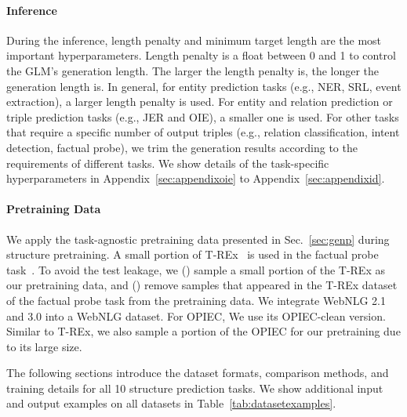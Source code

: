 \paragraph{Inference} During the inference, length penalty and minimum target length are the most important hyperparameters. Length penalty is a float between 0 and 1 to control the GLM's generation length. The larger the length penalty is, the longer the generation length is. In general, for entity prediction tasks (e.g., NER, SRL, event extraction), a larger length penalty is used. For entity and relation prediction or triple prediction tasks (e.g., JER and OIE), a smaller one is used. For other tasks that require a specific number of output triples (e.g., relation classification, intent detection, factual probe), we trim the generation results according to the requirements of different tasks. We show details of the task-specific hyperparameters in Appendix~\ref{sec:appendixoie} to Appendix~\ref{sec:appendixid}.

\paragraph{Pretraining Data}
We apply the task-agnostic pretraining data presented in Sec.~\ref{sec:genp} during structure pretraining. A small portion of T-REx~\cite{elsahar2018t} is used in the factual probe task~\cite{petroni2020context}. To avoid the test leakage, we (\expandafter{}) sample a small portion of the T-REx as our pretraining data, and (\expandafter{}) remove samples that appeared in the T-REx dataset of the factual probe task from the pretraining data. We integrate WebNLG 2.1 and 3.0 into a WebNLG dataset. For OPIEC, We use its OPIEC-clean version. Similar to T-REx, we also sample a portion of the OPIEC for our pretraining due to its large size.

The following sections introduce the dataset formats, comparison methods, and training details for all 10 structure prediction tasks. We show additional input and output examples on all datasets in Table~\ref{tab:datasetexamples}.

